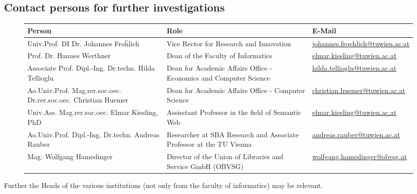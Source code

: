 \subsection{Contact persons for further investigations}

\begin{figure}[htbp]
\centering
	\begin{tabular}{| m{4.5cm} | m{4cm} | m{4.5cm} |} \hline
		\textbf{Person} & \textbf{Role} & \textbf{E-Mail}\\ \hline
		
    Univ.Prof. DI Dr. Johannes Fro\"hlich & Vice Rector for Research and Innovation & \href{mailto:johannes.froehlich@tuwien.ac.at}{johannes.froehlich@tuwien.ac.at}\\ \hline
		
    Prof. Dr. Hannes Werthner & Dean of the Faculty of Informatics & \href{mailto:elmar.kiesling@tuwien.ac.at}{elmar.kiesling@tuwien.ac.at}\\ \hline
		
    Associate Prof. Dipl.-Ing. Dr.techn. Hilda Tellioglu & Dean for Academic Affairs Office - Economics and Computer Science & \href{mailto:hilda.tellioglu@tuwien.ac.at}{hilda.tellioglu@tuwien.ac.at}\\ \hline
		
    
		Ao.Univ.Prof. Mag.rer.soc.oec. Dr.rer.soc.oec. Christian Huemer & Dean for Academic Affairs Office - Computer Science & \href{mailto:christian.huemer@tuwien.ac.at}{christian.huemer@tuwien.ac.at}\\ \hline
		
    Univ.Ass. Mag.rer.soc.oec. Elmar Kiesling, PhD & Assisstant Professor in the field of Semantic Web & \href{mailto:elmar.kiesling@tuwien.ac.at}{elmar.kiesling@tuwien.ac.at}\\ \hline
		
		Ao.Univ.Prof. Dipl.-Ing. Dr.techn. Andreas Rauber & Researcher at SBA Research and Associate Professor at the TU Vienna & \href{mailto:andreas.rauber@tuwien.ac.at}{andreas.rauber@tuwien.ac.at}\\ \hline
		
		Mag. Wolfgang Hamedinger &  Director of the Union of Libraries and Service GmbH (OBVSG)  & \href{mailto:wolfgang.hamedinger@obvsg.at}{wolfgang.hamedinger@obvsg.at}\\ \hline
		
	\end{tabular}
\end{figure}

Further the Heads of the various institutions (not only from the faculty of informatics) may be relevant.